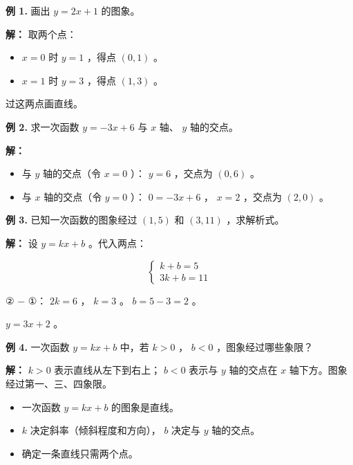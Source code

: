 \begin{workedexamples}


\textbf{例 1.} 画出 $y = 2x + 1$ 的图象。

\textbf{解：} 取两个点：

\begin{itemize}
  \item $x = 0$ 时 $y = 1$ ，得点 $(0, 1)$ 。
  \item $x = 1$ 时 $y = 3$ ，得点 $(1, 3)$ 。
\end{itemize}


过这两点画直线。

\textbf{例 2.} 求一次函数 $y = -3x + 6$ 与 $x$ 轴、 $y$ 轴的交点。

\textbf{解：}

\begin{itemize}
  \item 与 $y$ 轴的交点（令 $x = 0$ ）： $y = 6$ ，交点为 $(0, 6)$ 。
  \item 与 $x$ 轴的交点（令 $y = 0$ ）： $0 = -3x + 6$ ， $x = 2$ ，交点为 $(2, 0)$ 。
\end{itemize}


\textbf{例 3.} 已知一次函数的图象经过 $(1, 5)$ 和 $(3, 11)$ ，求解析式。

\textbf{解：} 设 $y = kx + b$ 。代入两点：

\[
\begin{cases} k + b = 5 \\ 3k + b = 11 \end{cases}
\]


② $-$ ①： $2k = 6$ ， $k = 3$ 。 $b = 5 - 3 = 2$ 。

$y = 3x + 2$ 。

\textbf{例 4.} 一次函数 $y = kx + b$ 中，若 $k > 0$ ， $b < 0$ ，图象经过哪些象限？

\textbf{解：} $k > 0$ 表示直线从左下到右上； $b < 0$ 表示与 $y$ 轴的交点在 $x$ 轴下方。图象经过第一、三、四象限。

\end{workedexamples}

\begin{keytakeaway}


\begin{itemize}
  \item 一次函数 $y = kx + b$ 的图象是直线。
  \item $k$ 决定斜率（倾斜程度和方向）， $b$ 决定与 $y$ 轴的交点。
  \item 确定一条直线只需两个点。
\end{itemize}


\end{keytakeaway}

